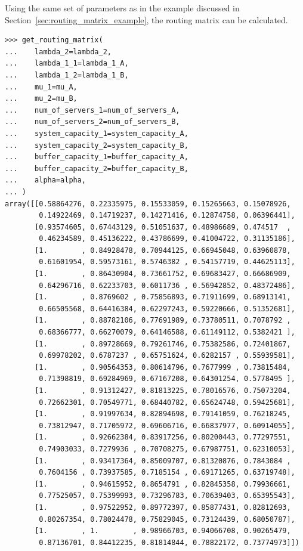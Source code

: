 \begin{sloppypar}
Using the same set of parameters as in the example discussed in
Section~\ref{sec:routing_matrix_example}, the routing matrix can be calculated.
\end{sloppypar}

\begin{lstlisting}[style=pystyle]
>>> get_routing_matrix(
...    lambda_2=lambda_2,
...    lambda_1_1=lambda_1_A,
...    lambda_1_2=lambda_1_B,
...    mu_1=mu_A,
...    mu_2=mu_B,
...    num_of_servers_1=num_of_servers_A,
...    num_of_servers_2=num_of_servers_B,
...    system_capacity_1=system_capacity_A,
...    system_capacity_2=system_capacity_B,
...    buffer_capacity_1=buffer_capacity_A,
...    buffer_capacity_2=buffer_capacity_B,
...    alpha=alpha,
... )
array([[0.58864276, 0.22335975, 0.15533059, 0.15265663, 0.15078926,
        0.14922469, 0.14719237, 0.14271416, 0.12874758, 0.06396441],
       [0.93574605, 0.67443129, 0.51051637, 0.48986689, 0.474517  ,
        0.46234589, 0.45136222, 0.43786699, 0.41004722, 0.31135186],
       [1.        , 0.84928478, 0.70944125, 0.66945048, 0.63960878,
        0.61601954, 0.59573161, 0.5746382 , 0.54157719, 0.44625113],
       [1.        , 0.86430904, 0.73661752, 0.69683427, 0.66686909,
        0.64296716, 0.62233703, 0.6011736 , 0.56942852, 0.48372486],
       [1.        , 0.8769602 , 0.75856893, 0.71911699, 0.68913141,
        0.66505568, 0.64416384, 0.62297243, 0.59220666, 0.51352681],
       [1.        , 0.88782106, 0.77691989, 0.73780511, 0.7078792 ,
        0.68366777, 0.66270079, 0.64146588, 0.61149112, 0.5382421 ],
       [1.        , 0.89728669, 0.79261746, 0.75382586, 0.72401867,
        0.69978202, 0.6787237 , 0.65751624, 0.6282157 , 0.55939581],
       [1.        , 0.90564353, 0.80614796, 0.7677999 , 0.73815484,
        0.71398819, 0.69284969, 0.67167208, 0.64301254, 0.5778495 ],
       [1.        , 0.91312427, 0.81813225, 0.78016576, 0.75073204,
        0.72662301, 0.70549771, 0.68440782, 0.65624748, 0.59425681],
       [1.        , 0.91997634, 0.82894698, 0.79141059, 0.76218245,
        0.73812947, 0.71705972, 0.69606716, 0.66837977, 0.60914055],
       [1.        , 0.92662384, 0.83917256, 0.80200443, 0.77297551,
        0.74903033, 0.7279936 , 0.70708275, 0.67987751, 0.62310053],
       [1.        , 0.93417364, 0.85009707, 0.81320876, 0.7843084 ,
        0.7604156 , 0.73937585, 0.7185154 , 0.69171265, 0.63719748],
       [1.        , 0.94615952, 0.8654791 , 0.82845358, 0.79936661,
        0.77525057, 0.75399993, 0.73296783, 0.70639403, 0.65395543],
       [1.        , 0.97522952, 0.89772397, 0.85877431, 0.82812693,
        0.80267354, 0.78024478, 0.75829045, 0.73124439, 0.68050787],
       [1.        , 1.        , 0.98966703, 0.94066708, 0.90265479,
        0.87136701, 0.84412235, 0.81814844, 0.78822172, 0.73774973]])

\end{lstlisting}


